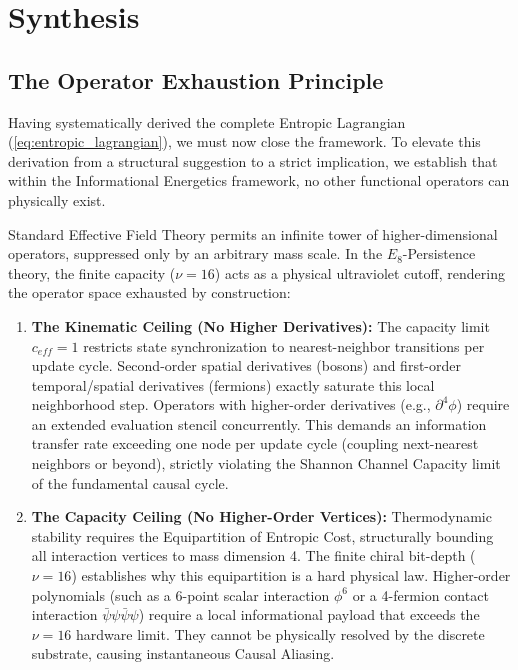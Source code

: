 \section{Synthesis}
\label{sec:synthesis}

\subsection{The Operator Exhaustion Principle}

Having systematically derived the complete Entropic Lagrangian (\cref{eq:entropic_lagrangian}), we must now close the framework. To elevate this derivation from a structural suggestion to a strict implication, we establish that within the Informational Energetics framework, no other functional operators can physically exist.

Standard Effective Field Theory permits an infinite tower of higher-dimensional operators, suppressed only by an arbitrary mass scale. In the $E_8$-Persistence theory, the finite capacity ($\nu=16$) acts as a physical ultraviolet cutoff, rendering the operator space exhausted by construction:

\begin{enumerate}
    \item \textbf{The Kinematic Ceiling (No Higher Derivatives):} The capacity limit $c_{eff} = 1$ restricts state synchronization to nearest-neighbor transitions per update cycle. Second-order spatial derivatives (bosons) and first-order temporal/spatial derivatives (fermions) exactly saturate this local neighborhood step. Operators with higher-order derivatives (e.g., $\partial^4\phi$) require an extended evaluation stencil concurrently. This demands an information transfer rate exceeding one node per update cycle (coupling next-nearest neighbors or beyond), strictly violating the Shannon Channel Capacity limit of the fundamental causal cycle.

    \item \textbf{The Capacity Ceiling (No Higher-Order Vertices):} Thermodynamic stability requires the Equipartition of Entropic Cost, structurally bounding all interaction vertices to mass dimension 4. The finite chiral bit-depth ($\nu = 16$) establishes why this equipartition is a hard physical law. Higher-order polynomials (such as a 6-point scalar interaction $\phi^6$ or a 4-fermion contact interaction $\bar{\psi}\psi\bar{\psi}\psi$) require a local informational payload that exceeds the $\nu = 16$ hardware limit. They cannot be physically resolved by the discrete substrate, causing instantaneous Causal Aliasing.
\end{enumerate}

